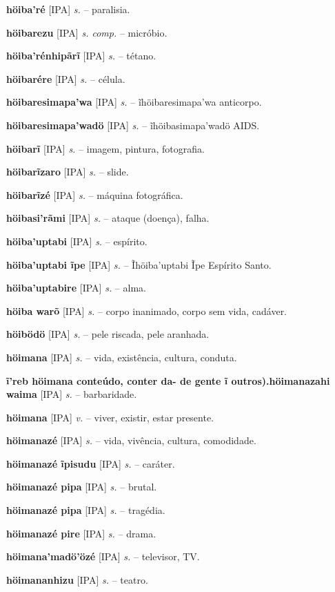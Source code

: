 \textbf{höiba'ré} [IPA] \textit{s.} -- paralisia.

\textbf{höibarezu} [IPA] \textit{s. comp.} -- micróbio.

\textbf{höiba'rénhipãrĩ} [IPA] \textit{s.} -- tétano.

\textbf{höibarére} [IPA] \textit{s.} -- célula.

\textbf{höibaresimapa'wa} [IPA] \textit{s.} -- ĩhöibaresimapa'wa anticorpo.

\textbf{höibaresimapa'wadö} [IPA] \textit{s.} -- ĩhöibasimapa'wadö AIDS.

\textbf{höibarĩ} [IPA] \textit{s.} -- imagem, pintura, fotografia.

\textbf{höibarĩzaro} [IPA] \textit{s.} -- slide.

\textbf{höibarĩzé} [IPA] \textit{s.} -- máquina fotográfica.

\textbf{höibasi'rãmi} [IPA] \textit{s.} -- ataque (doença), falha.

\textbf{höiba'uptabi} [IPA] \textit{s.} -- espírito.

\textbf{höiba'uptabi ĩpe} [IPA] \textit{s.} -- Ĩhöiba'uptabi Ĩpe Espírito Santo.

\textbf{höiba'uptabire} [IPA] \textit{s.} -- alma.

\textbf{höiba warõ} [IPA] \textit{s.} -- corpo inanimado, corpo sem vida, cadáver.

\textbf{höibödö} [IPA] \textit{s.} -- pele riscada, pele aranhada.

\textbf{höimana} [IPA] \textit{s.} -- vida, existência, cultura, conduta.

\textbf{ĩ'reb höimana conteúdo, conter da- de gente  ĩ outros).höimanazahi waima} [IPA] \textit{s.} -- barbaridade.

\textbf{höimana} [IPA] \textit{v.} -- viver, existir, estar presente.

\textbf{höimanazé} [IPA] \textit{s.} -- vida, vivência, cultura, comodidade.

\textbf{höimanazé ĩpisudu} [IPA] \textit{s.} -- caráter.

\textbf{höimanazé pipa} [IPA] \textit{s.} -- brutal.

\textbf{höimanazé pipa} [IPA] \textit{s.} -- tragédia.

\textbf{höimanazé pire} [IPA] \textit{s.} -- drama.

\textbf{höimana'madö'özé} [IPA] \textit{s.} -- televisor, TV.

\textbf{höimananhizu} [IPA] \textit{s.} -- teatro.

